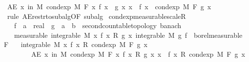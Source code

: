 \begin{isabellebody}
\ {\isachardoublequoteopen}AE\ x\ in\ M{\isachardot}{\kern0pt}\ cond{\isacharunderscore}{\kern0pt}exp\ M\ F\ {\isacharparenleft}{\kern0pt}{\isasymlambda}x{\isachardot}{\kern0pt}\ f\ x\ {\isacharasterisk}{\kern0pt}\ g\ x{\isacharparenright}{\kern0pt}\ x\ {\isacharequal}{\kern0pt}\ f\ x\ {\isacharasterisk}{\kern0pt}\ cond{\isacharunderscore}{\kern0pt}exp\ M\ F\ g\ x{\isachardoublequoteclose}\ \isamarkupfalse%
\ {\isacharparenleft}{\kern0pt}rule\ AE{\isacharunderscore}{\kern0pt}restr{\isacharunderscore}{\kern0pt}to{\isacharunderscore}{\kern0pt}subalg{\isacharbrackleft}{\kern0pt}OF\ subalg{\isacharbrackright}{\kern0pt}{\isacharparenright}{\kern0pt}\isanewline
{}\isamarkupfalse%
%
\endisatagproof
{\isafoldproof}%
%
\isadelimproof
\isanewline
%
\endisadelimproof
\isanewline
{}\isamarkupfalse%
\ cond{\isacharunderscore}{\kern0pt}exp{\isacharunderscore}{\kern0pt}measurable{\isacharunderscore}{\kern0pt}scaleR{\isacharcolon}{\kern0pt}\isanewline
\ \ \ f\ {\isacharcolon}{\kern0pt}{\isacharcolon}{\kern0pt}\ {\isachardoublequoteopen}{\isacharprime}{\kern0pt}a\ {\isasymRightarrow}\ real{\isachardoublequoteclose}\ \ g\ {\isacharcolon}{\kern0pt}{\isacharcolon}{\kern0pt}\ {\isachardoublequoteopen}{\isacharprime}{\kern0pt}a\ {\isasymRightarrow}\ {\isacharprime}{\kern0pt}b\ {\isacharcolon}{\kern0pt}{\isacharcolon}{\kern0pt}\ {\isacharbraceleft}{\kern0pt}second{\isacharunderscore}{\kern0pt}countable{\isacharunderscore}{\kern0pt}topology{\isacharcomma}{\kern0pt}\ banach{\isacharbraceright}{\kern0pt}{\isachardoublequoteclose}\isanewline
\ \ \ {\isacharbrackleft}{\kern0pt}measurable{\isacharbrackright}{\kern0pt}{\isacharcolon}{\kern0pt}\ {\isachardoublequoteopen}integrable\ M\ {\isacharparenleft}{\kern0pt}{\isasymlambda}x{\isachardot}{\kern0pt}\ f\ x\ {\isacharasterisk}{\kern0pt}\isactrlsub R\ g\ x{\isacharparenright}{\kern0pt}{\isachardoublequoteclose}\ {\isachardoublequoteopen}integrable\ M\ g{\isachardoublequoteclose}\ {\isachardoublequoteopen}f\ {\isasymin}\ borel{\isacharunderscore}{\kern0pt}measurable\ F{\isachardoublequoteclose}\isanewline
\ \ \ {\isachardoublequoteopen}integrable\ M\ {\isacharparenleft}{\kern0pt}{\isasymlambda}x{\isachardot}{\kern0pt}\ f\ x\ {\isacharasterisk}{\kern0pt}\isactrlsub R\ cond{\isacharunderscore}{\kern0pt}exp\ M\ F\ g\ x{\isacharparenright}{\kern0pt}{\isachardoublequoteclose}\isanewline
\ \ \ \ \ \ \ \ {\isachardoublequoteopen}AE\ x\ in\ M{\isachardot}{\kern0pt}\ cond{\isacharunderscore}{\kern0pt}exp\ M\ F\ {\isacharparenleft}{\kern0pt}{\isasymlambda}x{\isachardot}{\kern0pt}\ f\ x\ {\isacharasterisk}{\kern0pt}\isactrlsub R\ g\ x{\isacharparenright}{\kern0pt}\ x\ {\isacharequal}{\kern0pt}\ f\ x\ {\isacharasterisk}{\kern0pt}\isactrlsub R\ cond{\isacharunderscore}{\kern0pt}exp\ M\ F\ g\ x{\isachardoublequoteclose}\isanewline

\end{isabellebody}
